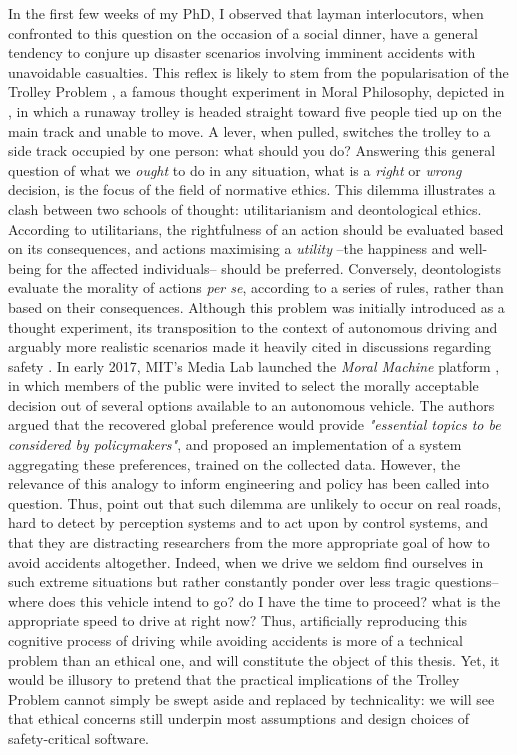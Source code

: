 In the first few weeks of my PhD, I observed that layman interlocutors, when confronted to this question on the occasion of a social dinner, have a general tendency to conjure up disaster scenarios involving imminent accidents with unavoidable casualties. This reflex is likely to stem from the popularisation of the Trolley Problem \citep{Foot1967}, a famous thought experiment in Moral Philosophy, depicted in , in which a runaway trolley is headed straight toward five people tied up on the main track and unable to move. A lever, when pulled, switches the trolley to a side track occupied by one person: what should you do? Answering this general question of what we \emph{ought} to do in any situation, what is a \emph{right} or \emph{wrong} decision, is the focus of the field of {normative ethics}. This dilemma illustrates a clash between two schools of thought: utilitarianism and deontological ethics. According to utilitarians, the rightfulness of an action should be evaluated based on its consequences, and actions maximising a \emph{utility} --the happiness and well-being for the affected individuals-- should be preferred. Conversely, deontologists evaluate the morality of actions \emph{per se}, according to a series of rules, rather than based on their consequences. Although this problem was initially introduced as a thought experiment, its transposition to the context of autonomous driving and arguably more realistic scenarios made it heavily cited in discussions regarding safety \citep[e.g.][]{Lin2015,Bonnefon2016,Gogoll2017}. In early 2017, MIT’s Media Lab launched the \emph{Moral Machine} platform \citep{Awad2018}, in which members of the public were invited to select the morally acceptable decision out of several options available to an autonomous vehicle. The authors argued that the recovered global preference would provide \emph{"essential topics to be considered by policymakers"}, and \citep{Noothigattu2018} proposed an implementation of a system aggregating these preferences, trained on the collected data. However, the relevance of this analogy to inform engineering and policy has been called into question. Thus, \citep{DeFreitas2019} point out that such dilemma are unlikely to occur on real roads, hard to detect by perception systems and to act upon by control systems, and that they are distracting researchers from the more appropriate goal of how to avoid accidents altogether. Indeed, when we drive we seldom find ourselves in such extreme situations but rather constantly ponder over less tragic questions-- where does this vehicle intend to go? do I have the time to proceed? what is the appropriate speed to drive at right now? Thus, artificially reproducing this cognitive process of driving while avoiding accidents is more of a technical problem than an ethical one, and will constitute the object of this thesis. Yet, it would be illusory to pretend that the practical implications of the Trolley Problem cannot simply be swept aside and replaced by technicality: we will see that ethical concerns still underpin most assumptions and design choices of safety-critical software.

